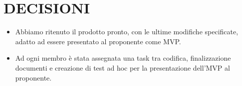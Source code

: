 \documentclass[5pt]{article}
\begin{document}
\section{DECISIONI}
\begin{itemize}
    \item Abbiamo ritenuto il prodotto pronto, con le ultime modifiche specificate, adatto ad essere presentato al proponente come MVP.
    \item Ad ogni membro è stata assegnata una task tra codifica, finalizzazione documenti e creazione di test ad hoc per la presentazione dell'MVP al proponente.
\end{itemize}
\end{document}
